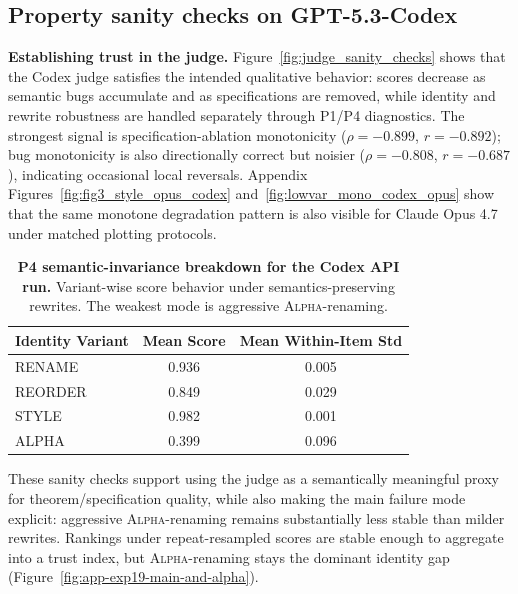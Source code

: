 \documentclass{article}
\begin{document}
\subsection{Property sanity checks on GPT-5.3-Codex}
\textbf{Establishing trust in the judge.} Figure~\ref{fig:judge_sanity_checks} shows that the Codex judge satisfies the intended qualitative behavior: scores decrease as semantic bugs accumulate and as specifications are removed, while identity and rewrite robustness are handled separately through P1/P4 diagnostics. The strongest signal is specification-ablation monotonicity (\(\rho=-0.899\), \(r=-0.892\)); bug monotonicity is also directionally correct but noisier (\(\rho=-0.808\), \(r=-0.687\)), indicating occasional local reversals. Appendix Figures~\ref{fig:fig3_style_opus_codex} and~\ref{fig:lowvar_mono_codex_opus} show that the same monotone degradation pattern is also visible for Claude Opus 4.7 under matched plotting protocols.

\begin{table}[t]
  \centering
  \scriptsize
  \begin{tabular}{lcc}
    \toprule
    \textbf{Identity Variant} & \textbf{Mean Score} & \textbf{Mean Within-Item Std} \\
    \midrule
    RENAME                    & 0.936               & 0.005                         \\
    REORDER                   & 0.849               & 0.029                         \\
    STYLE                     & 0.982               & 0.001                         \\
    ALPHA                     & 0.399               & 0.096                         \\
    \bottomrule
  \end{tabular}
  \caption{\textbf{P4 semantic-invariance breakdown for the Codex API run.}
    Variant-wise score behavior under semantics-preserving rewrites. The weakest mode is aggressive \textsc{Alpha}-renaming.}
  \label{tab:codex_invariance_variants}
\end{table}

These sanity checks support using the judge as a semantically meaningful proxy for theorem/specification quality, while also making the main failure mode explicit: aggressive \textsc{Alpha}-renaming remains substantially less stable than milder rewrites. Rankings under repeat-resampled scores are stable enough to aggregate into a trust index, but \textsc{Alpha}-renaming stays the dominant identity gap (Figure~\ref{fig:app-exp19-main-and-alpha}).
\end{document}
